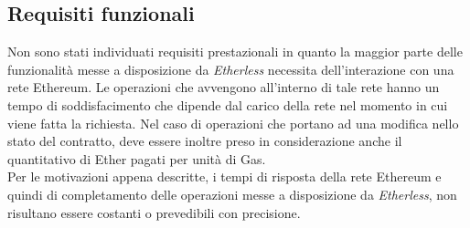 \subsection{Requisiti funzionali}
Non sono stati individuati requisiti prestazionali in quanto la maggior parte delle funzionalità messe a disposizione da \textit{Etherless} necessita dell'interazione con una rete Ethereum. Le operazioni che avvengono all'interno di tale rete hanno un tempo di soddisfacimento che dipende dal carico della rete nel momento in cui viene fatta la richiesta. Nel caso di operazioni che portano ad una modifica nello stato del contratto, deve essere inoltre preso in considerazione anche il quantitativo di Ether pagati per unità di Gas. \\ 
Per le motivazioni appena descritte, i tempi di risposta della rete Ethereum e quindi di completamento delle operazioni messe a disposizione da \textit{Etherless}, non risultano essere costanti o prevedibili con precisione. 